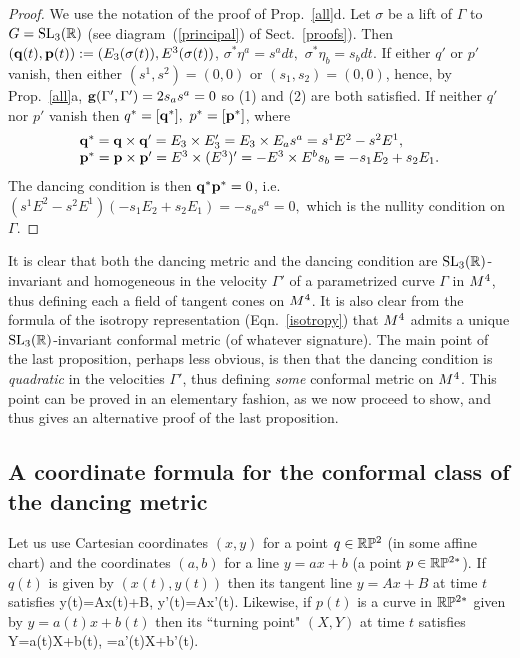 \begin{proof} We use the notation of the proof of Prop.~\ref{all}d. Let  $\sigma$ be a lift of $\Gamma$ to $G={\mathrm{SL}_3(\mathbb{R})}$ (see diagram~(\ref{principal}) of  Sect.~\ref{proofs}). Then 
$(\mathbf q(t),{\mathbf p}(t)):=(E_3(\sigma(t)), E^3(\sigma(t))$, $\sigma^*\eta^a=s^adt,$ $\sigma^*\eta_b=s_b dt.$
If  either $q'$ or $p'$ vanish, then either $(s^1, s^2)=(0,0)$ or $(s_1, s_2)=(0,0)$, hence, by Prop.~\ref{all}a,  $\mathbf{ g}(\Gamma', \Gamma')=2s_as^a=0$ so  (1) and (2) are both satisfied. If  neither $q'$ nor $p'$ vanish then  $q^*=[\mathbf q^*],$ $p^*=[{\mathbf p}^*]$,
where  
%
$$\begin{array}{l}
\mathbf q^*=\mathbf q\times \mathbf q'=E_3\times E_3'
=E_3\times E_a s^a
=s^1E^2-s^2 E^1,\\
{\mathbf p}^*={\mathbf p}\times {\mathbf p}'=E^3\times (E^3)'
 =-E^3\times E^bs_b=
-s_1E_2+s_2E_1.
\end{array}
$$
The dancing condition is  then $\mathbf q^*{\mathbf p}^*=0$, i.e. 
 $(s^1E^2-s^2 E^1)(-s_1E_2+s_2E_1)=-s_as^a=0,$
 which is the  nullity condition on $\Gamma$.\end{proof}
 
 \begin{rmrk} It is clear  that both the dancing metric and the dancing condition are ${\mathrm{SL}_3(\mathbb{R})}$-invariant and homogeneous in the velocity   $\Gamma'$ of a parametrized curve $\Gamma$ in $M^4$, thus defining each a field of tangent cones on $M^4$. It is also clear from the formula of the isotropy representation (Eqn.~\eqref{isotropy}) that $M^4$ admits a unique ${\mathrm{SL}_3(\mathbb{R})}$-invariant  conformal metric (of whatever signature). The main point of the last proposition, perhaps less obvious, is then  that the dancing condition  is {\em quadratic} in the velocities $\Gamma'$,  thus defining {\em some} conformal metric on $M^4$. This point can be proved   in an elementary fashion, as we now proceed to show, and thus gives an alternative  proof of the last proposition. 
  \end{rmrk}
  
\subsection{A coordinate formula for the   conformal class of the dancing metric} \label{simple}
Let us use Cartesian coordinates $(x,y)$  for  a point   $q\in\mathbb{R}\mathbb{P}^2$ (in some affine chart) and the coordinates $(a,b)$ for a  line 
$y=ax+b$ (a point  $p\in\mathbb{R}\mathbb{P}^{2*}$). If $q(t)$ is given by $(x(t), y(t))$ then its tangent line $y=Ax+B$ at time $t$ satisfies 
\be\label{d1}
y(t)=Ax(t)+B, \quad y'(t)=Ax'(t).
\ee 
Likewise, if $p(t)$ is  a curve in $\mathbb{R}\mathbb{P}^{2*}$ given by $y=a(t)x+b(t)$ then its  ``turning point"    $(X,Y)$ at time $t$  satisfies
\be\label{d2}
Y=a(t)X+b(t), =a'(t)X+b'(t).
\ee 

